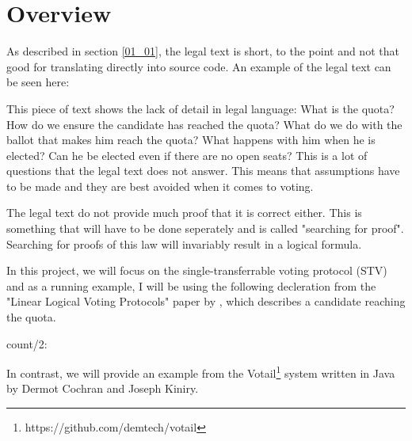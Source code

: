 \chapter{Overview}
\label{02}

As described in section \ref{01_01}, the legal text is short, to the point and not that good for translating directly into source code. An example of the legal text can be seen here:


This piece of text shows the lack of detail in legal language: What is the quota? How do we ensure the candidate has reached the quota? What do we do with the ballot that makes him reach the quota? What happens with him when he is elected? Can he be elected even if there are no open seats? This is a lot of questions that the legal text does not answer. This means that assumptions have to be made and they are best avoided when it comes to voting.

The legal text do not provide much proof that it is correct either. This is something that will have to be done seperately and is called "searching for proof". Searching for proofs of this law will invariably result in a logical formula. 

In this project, we will focus on the single-transferrable voting protocol (STV) and as a running example, I will be using the following decleration from the "Linear Logical Voting Protocols"\cite{Deyoung11} paper by \citeauthor{Deyoung11}, which describes a candidate reaching the quota.

\begin{textoform}
	count/2: \\
\end{textoform}

In contrast, we will provide an example from the Votail\footnote{https://github.com/demtech/votail} system written in Java by Dermot Cochran and Joseph Kiniry.

